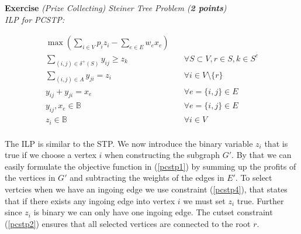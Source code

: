 \documentclass[a4paper,10pt]{article}
\newcounter{exc}
\newenvironment{exercise}[1]%
{\refstepcounter{exc}\textbf{Exercise \arabic{exc}} \emph{#1}\\}
{

\hrulefill\medskip}%
\newcommand{\Z}{\mathbb{Z}}
\begin{document}
\begin{exercise}{(Prize Collecting) Steiner Tree Problem (\textbf{2 points})}
\emph{ILP for PCSTP:}

\begin{align}
\label{pcstp1}
\max\left( \sum\limits_{i\in V} p_i z_i -\sum\limits_{e\in E} w_e x_e \right) & \\
\label{pcstp2}
\sum\limits_{(i,j)\in\delta^+(S)} y_{ij}\geq z_k & \quad\forall S\subset V, r\in S, k\in S^c \\
\label{pcstp3}
\sum_{(i,j)\in A} y_{ji} =z_i & \quad \forall i\in V\setminus \{r\}\\
\label{pcstp4}
y_{ij}+y_{ji} = x_e & \quad \forall e=\{i,j\}\in E \\
\label{pcstp5}
y_{ij}, x_e\in \mathbb{B}& \quad \forall e=\{i,j\}\in E \\
\label{pcstp6}
z_i\in \mathbb{B}& \quad \forall i\in V \\
\end{align}

The ILP is similar to the STP. We now introduce the binary variable $z_i$ that is true if we choose a vertex $i$ when constructing the subgraph $G'$. By that we can easily formulate the objective function in (\ref{pcstp1}) by summing up the profits of the vertices in $G'$ and subtracting the weights of the edges in $E'$. To select vertcies when we have an ingoing edge we use constraint (\ref{pcstp4}), that states that if there exists any ingoing edge into vertex $i$ we must set $z_i$ true. Further since $z_i$ is binary we can only have one ingoing edge. The cutset constraint (\ref{pcstp2}) ensures that all selected vertices are connected to the root $r$.

\end{exercise}
%
%
%
%
%
%
\end{document}
